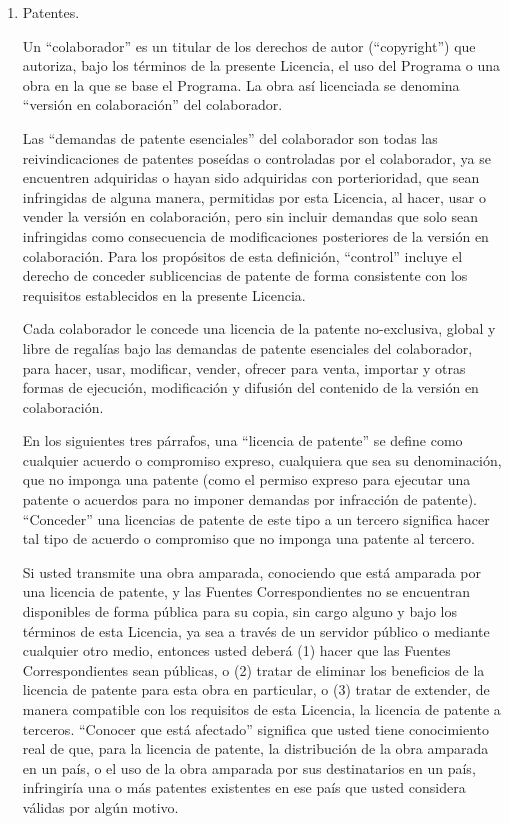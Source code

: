\documentclass[11pt]{article}
\begin{document}
\begin{enumerate}
\item Patentes.

Un ``colaborador'' es un titular de los derechos de autor (``copyright'') que 
autoriza, bajo los t\'{e}rminos de la presente Licencia, el uso del Programa o 
una obra en la que se base el Programa. La obra as\'{i} licenciada se denomina 
``versi\'{o}n en colaboraci\'{o}n'' del colaborador.

Las ``demandas de patente esenciales'' del colaborador son todas las 
reivindicaciones de patentes pose\'{i}das o controladas por el colaborador, ya 
se encuentren adquiridas o hayan sido adquiridas con porterioridad, que sean 
infringidas de alguna manera, permitidas por esta Licencia, al hacer, usar 
o vender la versi\'{o}n en colaboraci\'{o}n, pero sin incluir demandas que solo sean 
infringidas como consecuencia de modificaciones posteriores de la versi\'{o}n 
en colaboraci\'{o}n. Para los prop\'{o}sitos de esta definici\'{o}n, ``control'' incluye 
el derecho de conceder sublicencias de patente de forma consistente con los 
requisitos establecidos en la presente Licencia.

Cada colaborador le concede una licencia de la patente no-exclusiva, 
global y libre de regal\'{i}as bajo las demandas de patente esenciales del 
colaborador, para hacer, usar, modificar, vender, ofrecer para venta, 
importar y otras formas de ejecuci\'{o}n, modificaci\'{o}n y difusi\'{o}n del 
contenido de la versi\'{o}n en colaboraci\'{o}n.

En los siguientes tres p\'{a}rrafos, una ``licencia de patente'' se define como 
cualquier acuerdo o compromiso expreso, cualquiera que sea su denominaci\'{o}n, 
que no imponga una patente (como el permiso expreso para ejecutar una 
patente o acuerdos para no imponer demandas por infracci\'{o}n de patente). 
``Conceder'' una licencias de patente de este tipo a un tercero significa 
hacer tal tipo de acuerdo o compromiso que no imponga una patente al tercero.

Si usted transmite una obra amparada, conociendo que est\'{a} amparada por 
una licencia de patente, y las Fuentes Correspondientes no se encuentran 
disponibles de forma p\'{u}blica para su copia, sin cargo alguno y bajo los 
t\'{e}rminos de esta Licencia, ya sea a trav\'{e}s de un servidor p\'{u}blico o mediante 
cualquier otro medio, entonces usted deber\'{a} (1) hacer que las Fuentes 
Correspondientes sean p\'{u}blicas, o (2) tratar de eliminar los beneficios de 
la licencia de patente para esta obra en particular, o (3) tratar de 
extender, de manera compatible con los requisitos de esta Licencia, la 
licencia de patente a terceros. ``Conocer que est\'{a} afectado'' significa que 
usted tiene conocimiento real de que, para la licencia de patente, la 
distribuci\'{o}n de la obra amparada en un pa\'{i}s, o el uso de la obra amparada 
por sus destinatarios en un pa\'{i}s, infringir\'{i}a una o m\'{a}s patentes existentes 
en ese pa\'{i}s que usted considera v\'{a}lidas por alg\'{u}n motivo.


\end{enumerate}
\end{document}
